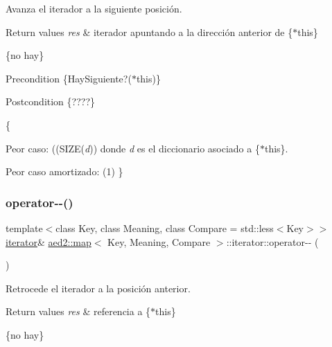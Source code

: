 Avanza el iterador a la siguiente posición. 


\begin{DoxyRetVals}{Return values}
{\em res} & iterador apuntando a la dirección anterior de \{$\ast$this\}\\
\hline
\end{DoxyRetVals}
\{no hay\}

\begin{DoxyPrecond}{Precondition}
\{Hay\+Siguiente?($\ast$this)\} 
\end{DoxyPrecond}
\begin{DoxyPostcond}{Postcondition}
\{????\}
\end{DoxyPostcond}
\{
\begin{DoxyItemize}
\item Peor caso\+: ((S\+I\+ZE({\itshape d})) donde {\itshape d} es el diccionario asociado a \{$\ast$this\}.
\item Peor caso amortizado\+: (1) \} 
\end{DoxyItemize}\mbox{\label{classaed2_1_1map_1_1iterator_ae7f70f71545d2a9de17b65edaaec748a}} 
\subsubsection{\texorpdfstring{operator-\/-\/()}{operator--()}\hspace{0.1cm}{\footnotesize\ttfamily [1/2]}}
{\footnotesize\ttfamily template$<$class Key, class Meaning, class Compare = std\+::less$<$\+Key$>$$>$ \\
\hyperlink{classaed2_1_1map_1_1iterator}{iterator}\& \hyperlink{classaed2_1_1map}{aed2\+::map}$<$ Key, Meaning, Compare $>$\+::iterator\+::operator-\/-\/ (\begin{DoxyParamCaption}{ }\end{DoxyParamCaption})\hspace{0.3cm}{\ttfamily [inline]}}



Retrocede el iterador a la posición anterior. 


\begin{DoxyRetVals}{Return values}
{\em res} & referencia a \{$\ast$this\}\\
\hline
\end{DoxyRetVals}
\{no hay\}

